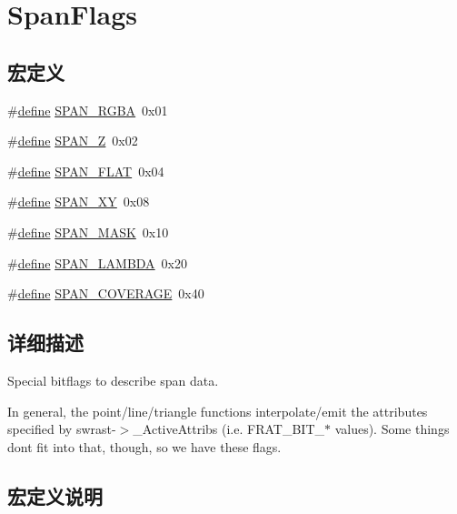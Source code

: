 \hypertarget{group___span_flags}{}\section{Span\+Flags}
\label{group___span_flags}
\subsection*{宏定义}
\begin{DoxyCompactItemize}
\item 
\#\hyperlink{structdefine}{define} \hyperlink{group___span_flags_ga7d15791438b7236d63521108ef65248c}{S\+P\+A\+N\+\_\+\+R\+G\+BA}~0x01
\item 
\#\hyperlink{structdefine}{define} \hyperlink{group___span_flags_ga6fe921fca2256cfa8141b2d297e0d645}{S\+P\+A\+N\+\_\+Z}~0x02
\item 
\#\hyperlink{structdefine}{define} \hyperlink{group___span_flags_gac0a4901eaa9fb72fe4c88a8124a24ff6}{S\+P\+A\+N\+\_\+\+F\+L\+AT}~0x04
\item 
\#\hyperlink{structdefine}{define} \hyperlink{group___span_flags_ga22cb93640a88233385fbf84b3999bb31}{S\+P\+A\+N\+\_\+\+XY}~0x08
\item 
\#\hyperlink{structdefine}{define} \hyperlink{group___span_flags_gad1692321b8b94adade99c5c08213c689}{S\+P\+A\+N\+\_\+\+M\+A\+SK}~0x10
\item 
\#\hyperlink{structdefine}{define} \hyperlink{group___span_flags_ga29aadf8243bf79fa31a1859d8b228582}{S\+P\+A\+N\+\_\+\+L\+A\+M\+B\+DA}~0x20
\item 
\#\hyperlink{structdefine}{define} \hyperlink{group___span_flags_ga9299961dda2f1477e2e3744bf7bd3993}{S\+P\+A\+N\+\_\+\+C\+O\+V\+E\+R\+A\+GE}~0x40
\end{DoxyCompactItemize}


\subsection{详细描述}
Special bitflags to describe span data.

In general, the point/line/triangle functions interpolate/emit the attributes specified by swrast-\/$>$\+\_\+\+Active\+Attribs (i.\+e. F\+R\+A\+T\+\_\+\+B\+I\+T\+\_\+$\ast$ values). Some things don\textquotesingle{}t fit into that, though, so we have these flags. 

\subsection{宏定义说明}
\mbox{\label{group___span_flags_ga9299961dda2f1477e2e3744bf7bd3993}} 
